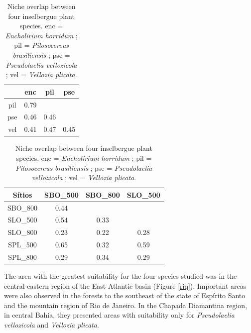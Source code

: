 \begin{table}[ht]
\caption{Niche overlap between four inselbergue plant species. enc = \textit{Encholirium horridum} ; pil = \textit{Pilosocereus brasiliensis} ; pse = \textit{Pseudolaelia vellozicola} ; vel = \textit{Vellozia plicata}.}
\label{tab_nicheoverlap} 
\centering
\begin{tabular}{cccc}
  \hline
 & enc & pil & pse \\ 
  \hline
pil & 0.79 &      &  \\ 
pse & 0.46 & 0.46 &  \\ 
vel & 0.41 & 0.47 & 0.45 \\ 
   \hline
\end{tabular}
\end{table}

\begin{table}[ht]
\caption{Niche overlap between four inselbergue plant species. enc = \textit{Encholirium horridum} ; pil = \textit{Pilosocereus brasiliensis} ; pse = \textit{Pseudolaelia vellozicola} ; vel = \textit{Vellozia plicata}.}
\label{tab_nicheoverlap} 
\centering
\begin{tabular}{cccc}
  \hline
Sítios	&	SBO_500	&	SBO_800	&	SLO_500	\\
  \hline
SBO\_800	&	0.44	&		&		\\
SLO\_500	&	0.54	&	0.33	&		\\
SLO\_800	&	0.23	&	0.22	&	0.28	\\
SPL\_500	&	0.65	&	0.32	&	0.59	\\
SPL\_800	&	0.29	&	0.34	&	0.29	\\
  \hline
\end{tabular}
\end{table}

The area with the greatest suitability for the four species studied was in the central-eastern region of the East Atlantic basin (Figure \ref{riq}). Important areas were also observed in the forests to the southeast of the state of Espírito Santo and the mountain region of Rio de Janeiro. In the Chapada Diamantina region, in central Bahia, they presented areas with suitability only for \textit{Pseudolaelia vellozicola} and \textit{Vellozia plicata}.

